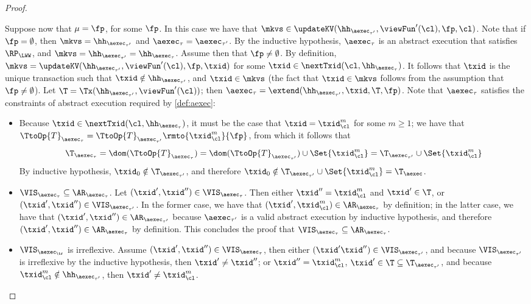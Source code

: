 \begin{proof}
\begin{itemize}
Suppose now that $\mu = \fp$, for some $\fp$. In this case we have that  
$\mkvs \in \updateKV(\hh_{\aexec_{\tau'}}, \viewFun'(\cl), \fp, \cl)$. Note that if 
$\fp = \emptyset$, then $\mkvs = \hh_{\aexec_{\tau'}}$ and $\aexec_{\tau} = \aexec_{\tau'}$. 
By the inductive hypothesis, $\aexec_{\tau}$ is an abstract execution that satisfies 
$\RP_{\LWW}$, and $\mkvs = \hh_{\aexec_{\tau'}} = \hh_{\aexec_{\tau}}$. 
Assume then that $\fp \neq \emptyset$. By definition, $\mkvs = \updateKV(\hh_{\aexec_{\tau'}}, 
\viewFun'(\cl), \fp, \txid)$ for some $\txid \in \nextTxid(\cl, \hh_{\aexec_{\tau}})$. It follows that $\txid$ 
is the unique transaction such that $\txid \notin \hh_{\aexec_{\tau'}}$, and $\txid \in \mkvs$ 
(the fact that $\txid \in \mkvs$ follows from the assumption that $\fp \neq \emptyset$). Let 
$\T = \Tx(\hh_{\aexec_{\tau'}}, \viewFun'(\cl))$; then $\aexec_{\tau} = \extend(\hh_{\aexec_{\tau'}}, \txid, \T, \fp)$. 
Note that $\aexec_{\tau}$ satisfies the constraints of abstract execution required by \cref{def:aexec}:
\begin{itemize}
\item  Because $\txid \in \nextTxid(\cl, \hh_{\aexec_{\tau}})$, it must be the case that $\txid = \txid_{\cl}^{m}$ for some 
$m \geq 1$; we have that $\TtoOp{T}_{\aexec_{\tau}} = \TtoOp{T}_{\aexec_{\tau'}}\rmto{\txid_{\cl}^{m}}{\fp}$, 
from which it follows that 
\[
\T_{\aexec_{\tau}} = \dom(\TtoOp{T}_{\aexec_{\tau}}) = \dom(\TtoOp{T}_{\aexec_{\tau'}}) \cup 
\Set{\txid_{\cl}^{m} } = \T_{\aexec_{\tau'}} \cup \Set{\txid_{\cl}^{m} }
\]
By inductive hypothesis, $\txid_0 \notin \T_{\aexec_{\tau'}}$, and therefore $\txid_{0} \notin 
\T_{\aexec_{\tau'}} \cup \Set{\txid_{\cl}^{m} } = \T_{\aexec}$.

\item \( \VIS_{\aexec_{\tau}} \subseteq \AR_{\aexec_{\tau}} \).
    Let $(\txid' ,\txid'') \in \VIS_{\aexec_{\tau}}$. Then either $\txid'' = \txid_{\cl}^{m}$ and $\txid' \in \T$, or $(\txid', \txid'') \in 
\VIS_{\aexec_{\tau'}}$. In the former case, we have that $(\txid', \txid_{\cl}^{m}) \in \AR_{\aexec_{\tau}}$ by definition; 
in the latter case, we have that $(\txid', \txid'') \in \AR_{\aexec_{\tau'}}$ because $\aexec_{\tau'}$ is a valid 
abstract execution by inductive hypothesis, and therefore $(\txid', \txid'') \in \AR_{\aexec_{\tau}}$ by definition. 
This concludes the proof that $\VIS_{\aexec_{\tau}} \subseteq \AR_{\aexec_{\tau}}$. 
\item \( \VIS_{\aexec_\tr} \) is irreflexive.
Assume $(\txid', \txid'') \in \VIS_{\aexec_{\tau}}$, then either 
$(\txid' \txid'') \in \VIS_{\aexec_{\tau'}}$, and because $\VIS_{\aexec_{\tau'}}$ is irreflexive by the inductive hypothesis, 
then $\txid' \neq \txid''$; 
or $\txid'' = \txid_{\cl}^{m}$, $\txid' \in \T \subseteq \T_{\aexec_{\tau'}}$, 
and because $\txid_{\cl}^{m} \notin \hh_{\aexec_{\tau'}}$, then $\txid' \neq \txid_{\cl}^{m}$. 


\end{itemize}
\end{itemize}
\end{proof}
